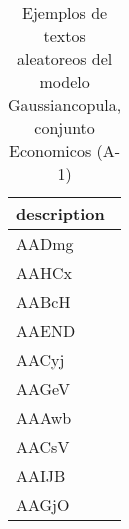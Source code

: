 \begin{table}[H]
\centering
\fontsize{8}{14}\selectfont
\caption{Ejemplos de textos aleatoreos del modelo Gaussiancopula, conjunto Economicos (A-1)}
\label{table-sample10-economicos-a-1-gaussiancopula-text}
\begin{tabular}{|m{50em}|}
\hline
\rowcolor[gray]{0.8}
description \\
\hline AADmg \\
\hline AAHCx \\
\hline AABcH \\
\hline AAEND \\
\hline AACyj \\
\hline AAGeV \\
\hline AAAwb \\
\hline AACsV \\
\hline AAIJB \\
\hline AAGjO \\
\hline
\end{tabular}
\end{table}
